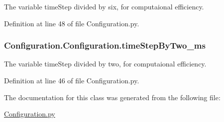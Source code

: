 The variable time\-Step divided by six, for computaional efficiency. 



Definition at line 48 of file Configuration.\-py.

\hypertarget{class_configuration_1_1_configuration_a58f6e3bf5491f8fb229697fc3690aa12}{
\subsubsection[{time\-Step\-By\-Two\-\_\-ms}]{\setlength{\rightskip}{0pt plus 5cm}Configuration.\-Configuration.\-time\-Step\-By\-Two\-\_\-ms}}\label{class_configuration_1_1_configuration_a58f6e3bf5491f8fb229697fc3690aa12}


The variable time\-Step divided by two, for computaional efficiency. 



Definition at line 46 of file Configuration.\-py.



The documentation for this class was generated from the following file\-:\begin{DoxyCompactItemize}
\item 
\hyperlink{_configuration_8py}{Configuration.\-py}\end{DoxyCompactItemize}
